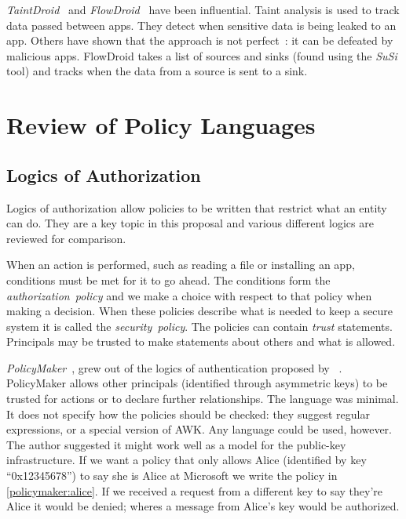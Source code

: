 \documentclass[a4paper,sfsidenotes]{%
  article%
}
\begin{document}
\emph{TaintDroid}~\cite{Enck:2010uw} and \emph{FlowDroid}~\cite{Fritz:2013vi}
have been influential.  Taint analysis is used to track data passed between
apps. They detect when sensitive data is being leaked to an app. Others have
shown that the approach is not perfect~\cite{Sarwar:2013ta}: it can be defeated
by malicious apps.  FlowDroid takes a list of sources and sinks (found using the
\emph{SuSi} tool\cite{Rasthofer:2014uq}) and tracks when the data from a source
is sent to a sink.  

\section{Review of Policy Languages}
\label{sec:authlang}

\subsection{Logics of Authorization}

Logics of authorization allow policies to be written that restrict what an
entity can do.  They are a key topic in this proposal and various different
logics are reviewed for comparison.

When an action is performed, such as reading a file or installing an app,
conditions must be met for it to go ahead. The conditions form the
\emph{authorization~policy} and we make a choice with respect to that policy
when making a decision. When these policies describe what
is needed to keep a secure system it is called the \emph{security~policy}.  The
policies can contain \emph{trust} statements. Principals may be trusted to make
statements about others and what is allowed.

\emph{PolicyMaker}~\cite{Blaze:dj}, grew out of the logics of authentication
proposed by
\citeauthor*{Wobber:1994dh}~\cite{Lampson:1992jg,Wobber:1994dh}.
PolicyMaker allows other principals (identified through asymmetric keys) to be
trusted for actions or to declare further relationships. The language was
minimal. It does not specify how the policies should be checked: they suggest
regular expressions, or  a special version of AWK. Any language could be
used, however.  The author suggested it might work well as a model for the
public-key infrastructure. If we want a policy that only allows Alice
(identified by key ``\textsf{0x12345678}'') to say she is Alice at Microsoft we
write the policy in \autoref{policymaker:alice}.  If we received a request
from a different key to say they're Alice it would be denied; wheres a message
from Alice's key would be authorized.
\end{document}
